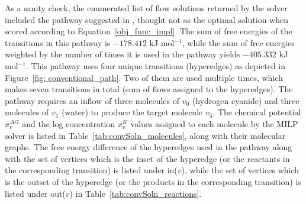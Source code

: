 As a sanity check, the enumerated list of flow solutions returned by the solver included the pathway suggested in \cite{implemented_CRN}, thought not as the optimal solution when scored according to Equation~\eqref{obj_func_impl}.
The sum of free energies of the transitions in this pathway is $-178.412$ kJ mol$^{-1}$, while the sum of free energies weighted by the number of times it is used in the pathway yields $-405.332$ kJ mol$^{-1}$.
This pathway uses four unique transitions (hyperedges) as depicted in Figure~\ref{fig: conventional_path}.
Two of them are used multiple times, which makes seven transitions in total (sum of flows assigned to the hyperedges).
The pathway requires an inflow of three molecules of $v_0$ (hydrogen cyanide) and three molecules of $v_1$ (water) to produce the target molecule $v_5$. The chemical potential $x_v^{\Delta G}$ and the log concentration $x_v^K$ values assigned to each molecule by the MILP solver is listed in Table~\ref{tab:convSoln_molecules}, along with their molecular graphs. The free energy difference of the hyperedges used in the pathway along with the set of vertices which is the inset of the hyperedge (or the reactants in the corresponding transition) is listed under in($v$), while the set of vertices which is the outset of the hyperedge (or the products in the corresponding transition) is listed under out($v$) in Table~\ref{tab:convSoln_reactions}.
\clearpage

